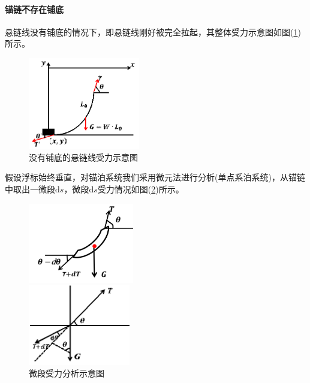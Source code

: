             \paragraph{锚链不存在铺底}悬链线没有铺底的情况下，即悬链线刚好被完全拉起，其整体受力示意图如图(\ref{fig:没有铺底的悬链线受力示意图})所示。
            \begin{figure}[H]
            \centering
            \includegraphics[height=4cm]{images/no_bottom_chain.jpg}
            \caption{没有铺底的悬链线受力示意图}
            \label{fig:没有铺底的悬链线受力示意图}
            \end{figure}
            \par
            假设浮标始终垂直，对锚泊系统我们采用微元法进行分析(单点系泊系统)，从锚链中取出一微段$\mathrm{d}s$，微段$\mathrm{d}s$受力情况如图(\ref{fig:微段受力分析示意图})所示。
            \begin{figure}[H]
              \centering
              \begin{varwidth}[t]{\textwidth}
                \vspace{0pt}
                \includegraphics[height=3.5cm]{images/micro_segmehts1.jpg}
              \end{varwidth}
              \qquad
              \begin{varwidth}[t]{\textwidth}
                \vspace{0pt}
                \includegraphics[height=3.5cm]{images/micro_segmehts2.jpg}
              \end{varwidth}
            \caption{微段受力分析示意图}
            \label{fig:微段受力分析示意图}
            \end{figure}
